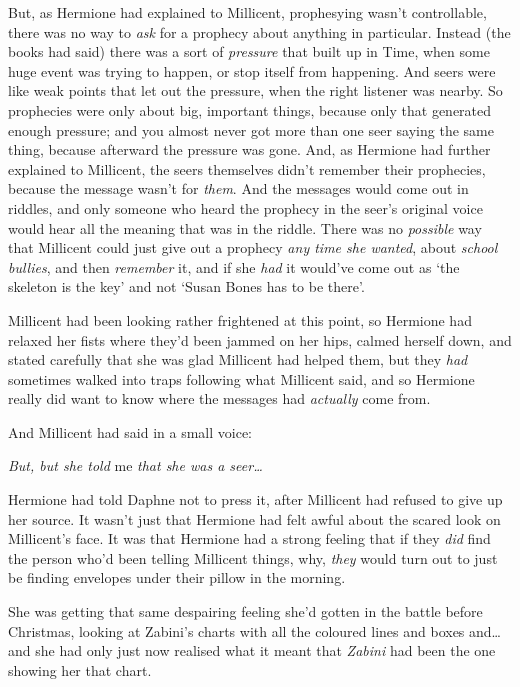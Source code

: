 But, as Hermione had explained to Millicent, prophesying wasn't
controllable, there was no way to \emph{ask} for a prophecy about
anything in particular. Instead (the books had said) there was a sort of
\emph{pressure} that built up in Time, when some huge event was trying
to happen, or stop itself from happening. And seers were like weak
points that let out the pressure, when the right listener was nearby. So
prophecies were only about big, important things, because only that
generated enough pressure; and you almost never got more than one seer
saying the same thing, because afterward the pressure was gone. And, as
Hermione had further explained to Millicent, the seers themselves didn't
remember their prophecies, because the message wasn't for \emph{them}.
And the messages would come out in riddles, and only someone who heard
the prophecy in the seer's original voice would hear all the meaning
that was in the riddle. There was no \emph{possible} way that Millicent
could just give out a prophecy \emph{any time she wanted}, about
\emph{school bullies}, and then \emph{remember} it, and if she
\emph{had} it would've come out as `the skeleton is the key' and not
`Susan Bones has to be there'.

Millicent had been looking rather frightened at this point, so Hermione
had relaxed her fists where they'd been jammed on her hips, calmed
herself down, and stated carefully that she was glad Millicent had
helped them, but they \emph{had} sometimes walked into traps following
what Millicent said, and so Hermione really did want to know where the
messages had \emph{actually} come from.

And Millicent had said in a small voice:

\emph{But, but she told} me \emph{that she was a seer\ldots{}}

Hermione had told Daphne not to press it, after Millicent had refused to
give up her source. It wasn't just that Hermione had felt awful about
the scared look on Millicent's face. It was that Hermione had a strong
feeling that if they \emph{did} find the person who'd been telling
Millicent things, why, \emph{they} would turn out to just be finding
envelopes under their pillow in the morning.

She was getting that same despairing feeling she'd gotten in the battle
before Christmas, looking at Zabini's charts with all the coloured lines
and boxes and\ldots{} and she had only just now realised what it meant
that \emph{Zabini} had been the one showing her that chart.

